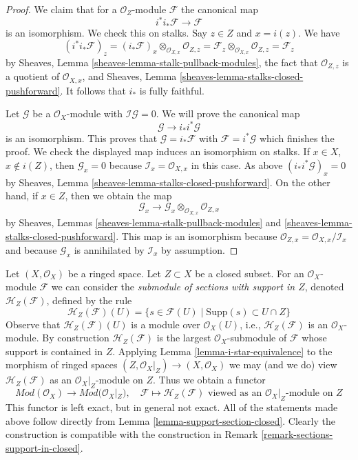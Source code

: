 \begin{proof}
We claim that for a $\mathcal{O}_Z$-module $\mathcal{F}$ the canonical map
$$
i^*i_*\mathcal{F} \longrightarrow \mathcal{F}
$$
is an isomorphism. We check this on stalks. Say $z \in Z$ and $x = i(z)$.
We have
$$
(i^*i_*\mathcal{F})_z =
(i_*\mathcal{F})_x \otimes_{\mathcal{O}_{X, x}} \mathcal{O}_{Z, z} =
\mathcal{F}_z \otimes_{\mathcal{O}_{X, x}} \mathcal{O}_{Z, z} =
\mathcal{F}_z
$$
by Sheaves, Lemma \ref{sheaves-lemma-stalk-pullback-modules},
the fact that $\mathcal{O}_{Z, z}$ is a quotient of $\mathcal{O}_{X, x}$, and
Sheaves, Lemma \ref{sheaves-lemma-stalks-closed-pushforward}.
It follows that $i_*$ is fully faithful.

\medskip\noindent
Let $\mathcal{G}$ be a $\mathcal{O}_X$-module with
$\mathcal{I}\mathcal{G} = 0$. We will prove the canonical map
$$
\mathcal{G} \longrightarrow i_*i^*\mathcal{G}
$$
is an isomorphism. This proves that $\mathcal{G} = i_*\mathcal{F}$
with $\mathcal{F} = i^*\mathcal{G}$ which finishes the proof.
We check the displayed map induces an isomorphism on stalks.
If $x \in X$, $x \not \in i(Z)$, then $\mathcal{G}_x = 0$
because $\mathcal{I}_x = \mathcal{O}_{X, x}$ in this
case. As above $(i_*i^*\mathcal{G})_x = 0$ by
Sheaves, Lemma \ref{sheaves-lemma-stalks-closed-pushforward}.
On the other hand, if $x \in Z$, then we obtain the map
$$
\mathcal{G}_x
\longrightarrow
\mathcal{G}_x \otimes_{\mathcal{O}_{X, x}} \mathcal{O}_{Z, x}
$$
by Sheaves, Lemmas \ref{sheaves-lemma-stalk-pullback-modules} and
\ref{sheaves-lemma-stalks-closed-pushforward}. This map is an isomorphism
because $\mathcal{O}_{Z, x} = \mathcal{O}_{X, x}/\mathcal{I}_x$
and because $\mathcal{G}_x$ is annihilated by $\mathcal{I}_x$ by assumption.
\end{proof}

\begin{remark}
\label{remark-sections-support-in-closed-modules}
Let $(X, \mathcal{O}_X)$ be a ringed space. Let $Z \subset X$ be
a closed subset. For an $\mathcal{O}_X$-module $\mathcal{F}$ we can
consider the {\it submodule of sections with support in $Z$}, denoted
$\mathcal{H}_Z(\mathcal{F})$, defined by the rule
$$
\mathcal{H}_Z(\mathcal{F})(U) =
\{s \in \mathcal{F}(U) \mid \text{Supp}(s) \subset U \cap Z\}
$$
Observe that $\mathcal{H}_Z(\mathcal{F})(U)$ is a module over
$\mathcal{O}_X(U)$, i.e., $\mathcal{H}_Z(\mathcal{F})$ is an
$\mathcal{O}_X$-module. By construction $\mathcal{H}_Z(\mathcal{F})$
is the largest $\mathcal{O}_X$-submodule of $\mathcal{F}$ whose support is
contained in $Z$.
Applying Lemma \ref{lemma-i-star-equivalence} to
the morphism of ringed spaces $(Z, \mathcal{O}_X|_Z) \to (X, \mathcal{O}_X)$ we
may (and we do) view
$\mathcal{H}_Z(\mathcal{F})$ as an $\mathcal{O}_X|_Z$-module on $Z$.
Thus we obtain a functor
$$
\textit{Mod}(\mathcal{O}_X) \longrightarrow \textit{Mod}(\mathcal{O}_X|_Z),
\quad
\mathcal{F} \longmapsto \mathcal{H}_Z(\mathcal{F})
\text{ viewed as an }\mathcal{O}_X|_Z\text{-module on }Z
$$
This functor is left exact, but in general not exact.
All of the statements made above follow directly from
Lemma \ref{lemma-support-section-closed}.
Clearly the construction is compatible with the construction in
Remark \ref{remark-sections-support-in-closed}.
\end{remark}

